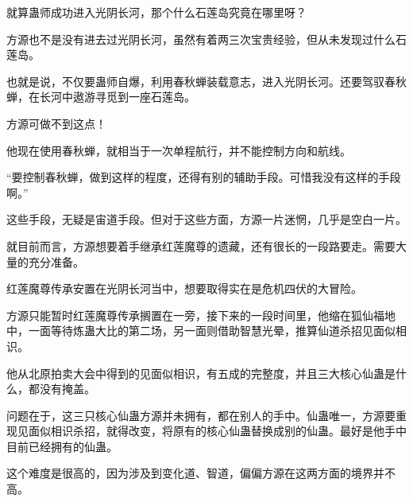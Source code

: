 \begin{this_body}
就算蛊师成功进入光阴长河，那个什么石莲岛究竟在哪里呀？

方源也不是没有进去过光阴长河，虽然有着两三次宝贵经验，但从未发现过什么石莲岛。

也就是说，不仅要蛊师自爆，利用春秋蝉装载意志，进入光阴长河。还要驾驭春秋蝉，在长河中遨游寻觅到一座石莲岛。

方源可做不到这点！

他现在使用春秋蝉，就相当于一次单程航行，并不能控制方向和航线。

“要控制春秋蝉，做到这样的程度，还得有别的辅助手段。可惜我没有这样的手段啊。”

这些手段，无疑是宙道手段。但对于这些方面，方源一片迷惘，几乎是空白一片。

就目前而言，方源想要着手继承红莲魔尊的遗藏，还有很长的一段路要走。需要大量的充分准备。

红莲魔尊传承安置在光阴长河当中，想要取得实在是危机四伏的大冒险。

方源只能暂时红莲魔尊传承搁置在一旁，接下来的一段时间里，他缩在狐仙福地中，一面等待炼蛊大比的第二场，另一面则借助智慧光晕，推算仙道杀招见面似相识。

他从北原拍卖大会中得到的见面似相识，有五成的完整度，并且三大核心仙蛊是什么，都没有掩盖。

问题在于，这三只核心仙蛊方源并未拥有，都在别人的手中。仙蛊唯一，方源要重现见面似相识杀招，就得改变，将原有的核心仙蛊替换成别的仙蛊。最好是他手中目前已经拥有的仙蛊。

这个难度是很高的，因为涉及到变化道、智道，偏偏方源在这两方面的境界并不高。

\end{this_body}

